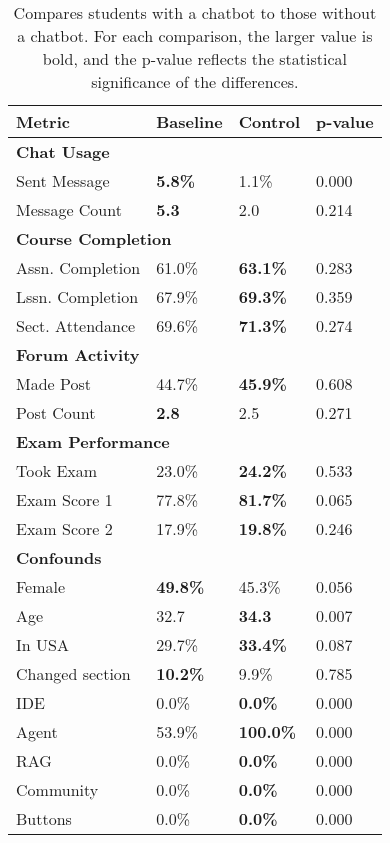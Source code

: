 \begin{table}
\centering
\begin{tabularx}{\columnwidth}{l X X X}
\toprule
\textbf{Metric} & \textbf{Baseline} & \textbf{Control} & \textbf{p-value} \\
\midrule
\multicolumn{4}{l}{\textbf{Chat Usage}} \\
Sent Message & \textbf{5.8\%} & 1.1\% & 0.000 \\
Message Count & \textbf{5.3} & 2.0 & 0.214 \\
\midrule
\multicolumn{4}{l}{\textbf{Course Completion}} \\
Assn. Completion & 61.0\% & \textbf{63.1\%} & 0.283 \\
Lssn. Completion & 67.9\% & \textbf{69.3\%} & 0.359 \\
Sect. Attendance & 69.6\% & \textbf{71.3\%} & 0.274 \\
\midrule
\multicolumn{4}{l}{\textbf{Forum Activity}} \\
Made Post & 44.7\% & \textbf{45.9\%} & 0.608 \\
Post Count & \textbf{2.8} & 2.5 & 0.271 \\
\midrule
\multicolumn{4}{l}{\textbf{Exam Performance}} \\
Took Exam & 23.0\% & \textbf{24.2\%} & 0.533 \\
Exam Score 1 & 77.8\% & \textbf{81.7\%} & 0.065 \\
Exam Score 2 & 17.9\% & \textbf{19.8\%} & 0.246 \\
\midrule
\multicolumn{4}{l}{\textbf{Confounds}} \\
Female & \textbf{49.8\%} & 45.3\% & 0.056 \\
Age & 32.7 & \textbf{34.3} & 0.007 \\
In USA & 29.7\% & \textbf{33.4\%} & 0.087 \\
Changed section & \textbf{10.2\%} & 9.9\% & 0.785 \\
IDE & 0.0\% & \textbf{0.0\%} & 0.000 \\
Agent & 53.9\% & \textbf{100.0\%} & 0.000 \\
RAG & 0.0\% & \textbf{0.0\%} & 0.000 \\
Community & 0.0\% & \textbf{0.0\%} & 0.000 \\
Buttons & 0.0\% & \textbf{0.0\%} & 0.000 \\
\bottomrule
\end{tabularx}
\caption{Compares students with a chatbot to those without a chatbot. For each comparison, the larger value is bold, and the p-value reflects the statistical significance of the differences.}
\label{tab:control-table-complete}
\end{table}